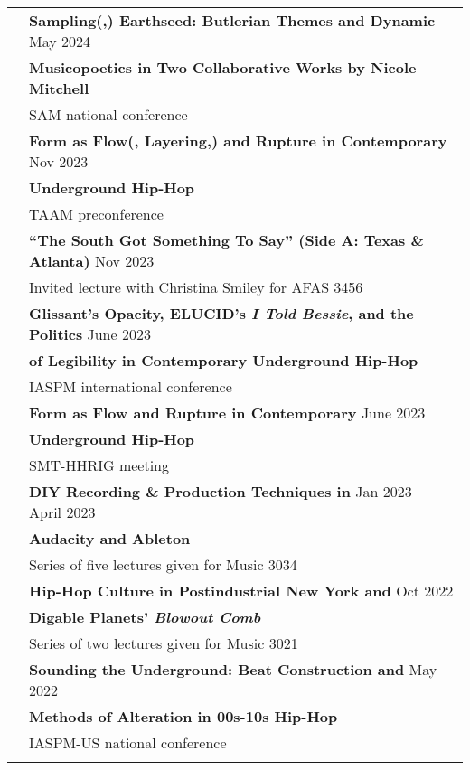 \documentclass[letterpaper, 11pt]{article}
\begin{document}
\begin{longtable}{p{1.3in}p{4.8in}}
{\color{OliveGreen}{Presentations}}
& \textbf{Sampling(,) Earthseed: Butlerian Themes and Dynamic} \hfill{May 2024} \\
{\color{OliveGreen}{\& Lectures}} 
& \textbf{Musicopoetics in  Two Collaborative Works by Nicole Mitchell} \\
& SAM national conference \\
& \textbf{Form as Flow(, Layering,) and Rupture in Contemporary} \hfill{Nov 2023}  \\
& \textbf{Underground Hip-Hop}  \\
& TAAM preconference \\
& \textbf{``The South Got Something To Say'' (Side A: Texas \& Atlanta)} \hfill{Nov 2023}  \\
& Invited lecture with Christina Smiley for AFAS 3456 \\
& \textbf{Glissant's Opacity, ELUCID's \textit{I Told Bessie}, and the Politics} \hfill{June 2023} \\
& \textbf{of Legibility in Contemporary Underground Hip-Hop} \\
& IASPM international conference \\
& \textbf{Form as Flow and Rupture in Contemporary} \hfill{June 2023} \\
& \textbf{Underground Hip-Hop} \\
& SMT-HHRIG meeting\\
& \textbf{DIY Recording \& Production Techniques in} \hfill{Jan 2023 -- April 2023} \\
& \textbf{Audacity and Ableton} \\
& Series of five lectures given for Music 3034 \\
& \textbf{Hip-Hop Culture in Postindustrial New York and} \hfill{Oct 2022} \\
& \textbf{Digable Planets' \textit{Blowout Comb}} \\
& Series of two lectures given for Music 3021 \\
& \textbf{Sounding the Underground: Beat Construction and} \hfill{May 2022} \\
& \textbf{Methods of Alteration in 00s-10s Hip-Hop} \\
& IASPM-US national conference \\
& \\


\end{longtable}
\end{document}
